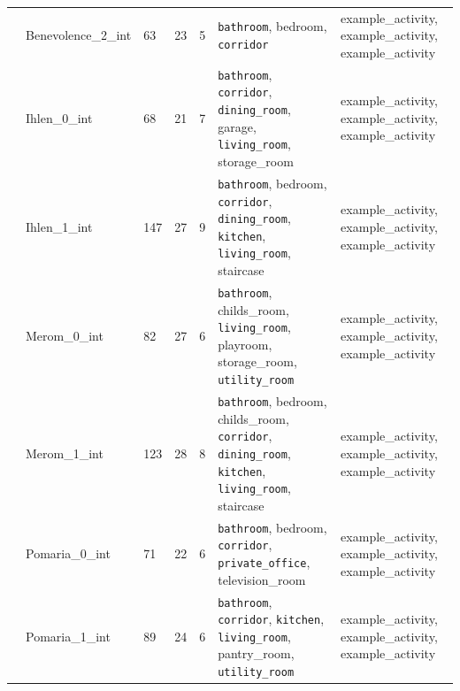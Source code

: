 {\begin{table}[H]
{\begin{tabular}{|m{0.8cm}|m{4cm}|m{0.6cm}|m{0.6cm}|m{0.6cm}|m{5cm}|m{5cm}|}
& Benevolence\_2\_int                   & 63           & 23           & 5          & \texttt{bathroom}, bedroom, \texttt{corridor}                                                                                                                      & example\_activity, example\_activity, example\_activity      \\ \cline{2-7} 
& Ihlen\_0\_int                         & 68           & 21           & 7          & \texttt{bathroom}, \texttt{corridor}, \texttt{dining\_room}, garage, \texttt{living\_room}, storage\_room                                                                            & example\_activity, example\_activity, example\_activity      \\ \cline{2-7} 
& Ihlen\_1\_int                         & 147          & 27           & 9          & \texttt{bathroom}, bedroom, \texttt{corridor}, \texttt{dining\_room}, \texttt{kitchen}, \texttt{living\_room}, staircase                                                                      & example\_activity, example\_activity, example\_activity      \\ \cline{2-7} 
& Merom\_0\_int                         & 82           & 27           & 6          & \texttt{bathroom}, childs\_room, \texttt{living\_room}, playroom, storage\_room, \texttt{utility\_room}                                                                     & example\_activity, example\_activity, example\_activity      \\ \cline{2-7} 
& Merom\_1\_int                         & 123          & 28           & 8          & \texttt{bathroom}, bedroom, childs\_room, \texttt{corridor}, \texttt{dining\_room}, \texttt{kitchen}, \texttt{living\_room}, staircase                                                        & example\_activity, example\_activity, example\_activity      \\ \cline{2-7} 
& Pomaria\_0\_int                       & 71           & 22           & 6          & \texttt{bathroom}, bedroom, \texttt{corridor}, \texttt{private\_office}, television\_room                                                                                   & example\_activity, example\_activity, example\_activity      \\ \cline{2-7} 
& Pomaria\_1\_int                       & 89           & 24           & 6          & \texttt{bathroom}, \texttt{corridor}, \texttt{kitchen}, \texttt{living\_room}, pantry\_room, \texttt{utility\_room}                                                                           & example\_activity, example\_activity, example\_activity      \\ \cline{2-7} 

\end{tabular}}
\end{table}}
